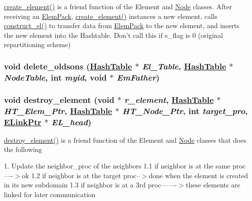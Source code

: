 \hyperlink{classElement_n12}{create\_\-element()} is a friend function of the Element and \hyperlink{classNode}{Node} classes. After receiving an \hyperlink{structElemPack}{Elem\-Pack}, \hyperlink{classElement_n12}{create\_\-element()} instances a new element, calls \hyperlink{classElement_n13}{construct\_\-el()} to transfer data from \hyperlink{structElemPack}{Elem\-Pack} to the new element, and inserts the new element into the Hashtable. Don't call this if s\_\-flag is 0 (original repartitioning scheme) 

\hypertarget{classElement_n5}{
\subsubsection[delete\_\-oldsons]{\setlength{\rightskip}{0pt plus 5cm}void delete\_\-oldsons (\hyperlink{classHashTable}{Hash\-Table} $\ast$ {\em El\_\-Table}, \hyperlink{classHashTable}{Hash\-Table} $\ast$ {\em Node\-Table}, int {\em myid}, void $\ast$ {\em Em\-Father})}}
\label{classElement_n5}


\hypertarget{classElement_n11}{
\subsubsection[destroy\_\-element]{\setlength{\rightskip}{0pt plus 5cm}void destroy\_\-element (void $\ast$ {\em r\_\-element}, \hyperlink{classHashTable}{Hash\-Table} $\ast$ {\em HT\_\-Elem\_\-Ptr}, \hyperlink{classHashTable}{Hash\-Table} $\ast$ {\em HT\_\-Node\_\-Ptr}, int {\em target\_\-pro}, \hyperlink{structElementLink}{ELink\-Ptr} $\ast$ {\em EL\_\-head})}}
\label{classElement_n11}


\hyperlink{classElement_n11}{destroy\_\-element()} is a friend function of the Element and \hyperlink{classNode}{Node} classes that does the following

1. Update the neighbor\_\-proc of the neighbors 1.1 if neighbor is at the same proc----$>$ok 1.2 if neighbor is at the target proc--$>$done when the element is created in its new subdomain 1.3 if neighbor is at a 3rd proc-------$>$these elements are linked for later communication

